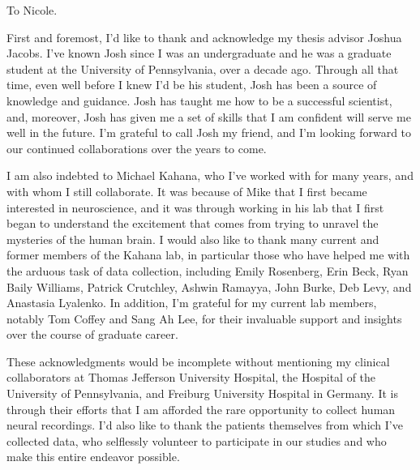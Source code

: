 \begin{preamble}

\iffinal{}{\newpage}

\begin{DUTdedications}
\begin{center}
To Nicole.
\end{center}
\end{DUTdedications}

\iffinal{}{\newpage}

\begin{acknowledgments}
First and foremost, I'd like to thank and acknowledge my thesis advisor Joshua Jacobs. I've known Josh since I was an undergraduate and he was a graduate student at the University of Pennsylvania, over a decade ago. Through all that time, even well before I knew I'd be his student, Josh has been a source of knowledge and guidance. Josh has taught me how to be a successful scientist, and, moreover, Josh has given me a set of skills that I am confident will serve me well in the future. I'm grateful to call Josh my friend, and I'm looking forward to our continued collaborations over the years to come.

I am also indebted to Michael Kahana, who I've worked with for many years, and with whom I still collaborate. It was because of Mike that I first became interested in neuroscience, and it was through working in his lab that I first began to understand the excitement that comes from trying to unravel the mysteries of the human brain. I would also like to thank many current and former members of the Kahana lab, in particular those who have helped me with the arduous task of data collection, including Emily Rosenberg, Erin Beck, Ryan Baily Williams, Patrick Crutchley, Ashwin Ramayya, John Burke, Deb Levy, and Anastasia Lyalenko. In addition, I'm grateful for my current lab members, notably Tom Coffey and Sang Ah Lee, for their invaluable support and insights over the course of graduate career.

These acknowledgments would be incomplete without mentioning my clinical collaborators at Thomas Jefferson University Hospital, the Hospital of the University of Pennsylvania, and Freiburg University Hospital in Germany. It is through their efforts that I am afforded the rare opportunity to collect human neural recordings. I'd also like to thank the patients themselves from which I've collected data, who selflessly volunteer to participate in our studies and who make this entire endeavor possible.


\end{acknowledgments}
\end{preamble}
